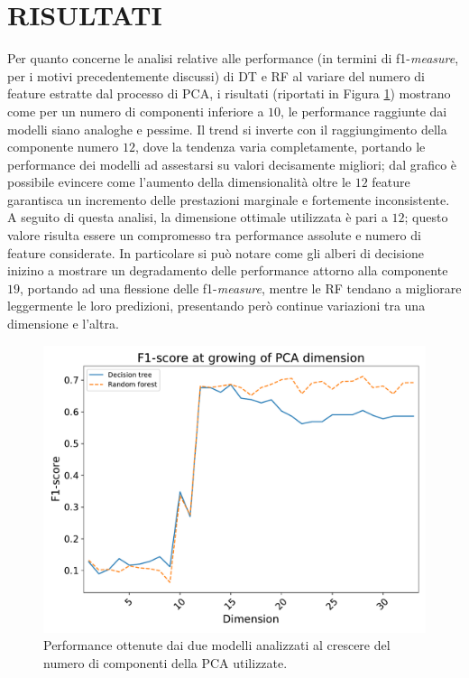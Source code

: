 \section{RISULTATI}
Per quanto concerne le analisi relative alle performance (in termini di f1-\textit{measure}, per i motivi precedentemente discussi) di DT e RF al variare del numero di feature estratte dal processo di PCA, i risultati (riportati in Figura \ref{fig:pca-perf}) mostrano come per un numero di componenti inferiore a $10$, le performance raggiunte dai modelli siano analoghe e pessime.
Il trend si inverte con il raggiungimento della componente numero $12$, dove la tendenza varia completamente, portando le performance dei modelli ad assestarsi su valori decisamente migliori; dal grafico è possibile evincere come l'aumento della dimensionalità oltre le $12$ feature garantisca un incremento delle prestazioni marginale e fortemente inconsistente.
A seguito di questa analisi, la dimensione ottimale utilizzata è pari a $12$; questo valore risulta essere un compromesso tra performance assolute e numero di feature considerate.
In particolare si può notare come gli alberi di decisione inizino a mostrare un degradamento delle performance attorno alla componente $19$, portando ad una flessione delle f1-\textit{measure}, mentre le RF tendano a migliorare leggermente le loro predizioni, presentando però continue variazioni tra una dimensione e l'altra.\\
\begin{figure}
	\centering
	\includegraphics[width=1\linewidth]{images/pca-perf}
	\caption{Performance ottenute dai due modelli analizzati al crescere del numero di componenti della PCA utilizzate.}
	\label{fig:pca-perf}
\end{figure}
